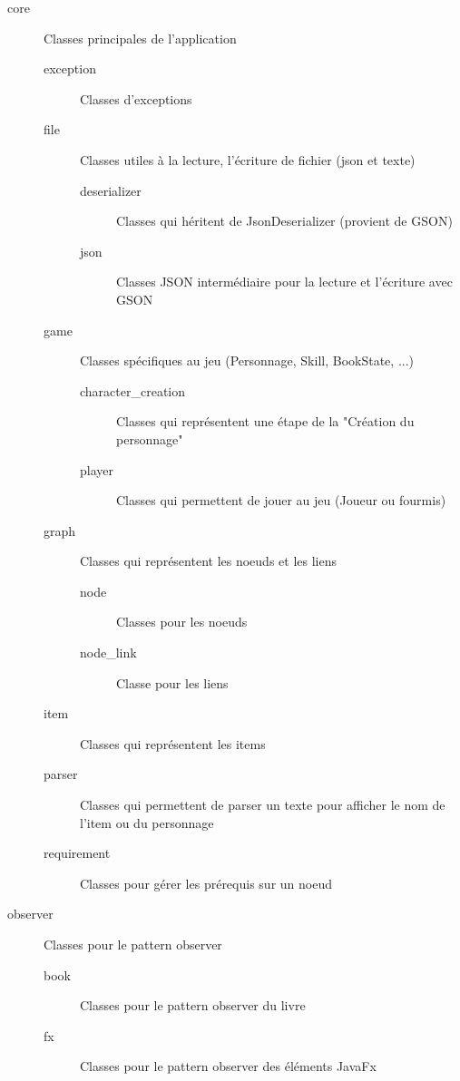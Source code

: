 		\begin{description}
			\item[core]{Classes principales de l'application}
			\begin{description}
				\item[exception]{Classes d'exceptions}
				\item[file]{Classes utiles à la lecture, l'écriture de fichier (json et texte)}
				\begin{description}
					\item[deserializer]{Classes qui héritent de JsonDeserializer (provient de GSON)}
					\item[json]{Classes JSON intermédiaire pour la lecture et l'écriture avec GSON}
				\end{description}
				\item[game]{Classes spécifiques au jeu (Personnage, Skill, BookState, ...)}
				\begin{description}
					\item[character\_creation]{Classes qui représentent une étape de la "Création du personnage"}
					\item[player]{Classes qui permettent de jouer au jeu (Joueur ou fourmis)}
				\end{description}
				\item[graph]{Classes qui représentent les noeuds et les liens}
				\begin{description}
					\item[node]{Classes pour les noeuds}
					\item[node\_link]{Classe pour les liens}
				\end{description}
				\item[item]{Classes qui représentent les items}
				\item[parser]{Classes qui permettent de parser un texte pour afficher le nom de l'item ou du personnage}
				\item[requirement]{Classes pour gérer les prérequis sur un noeud}
			\end{description}

			\item[observer]{Classes pour le pattern observer}
			\begin{description}
				\item[book]{Classes pour le pattern observer du livre}
				\item[fx]{Classes pour le pattern observer des éléments JavaFx}
			\end{description}


\end{description}
